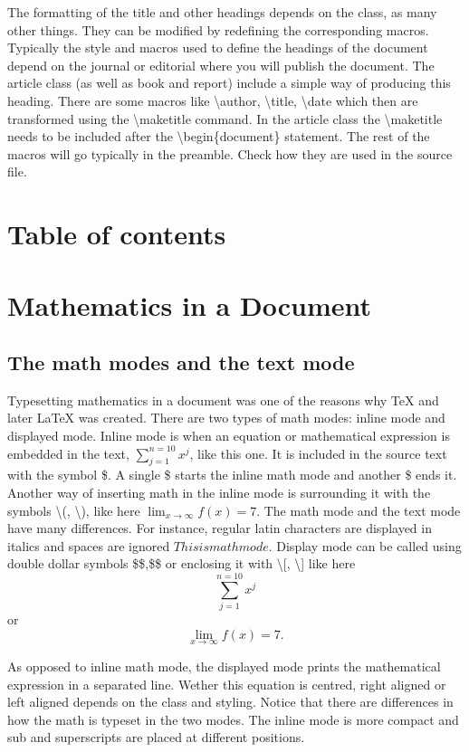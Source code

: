 \documentclass[a4paper]{article}
\newcommand{\bs}[1]{{\color{blue}\textbackslash{}#1}}
\begin{document}
The formatting of the title and other headings depends on the class, as many other things. They can be modified by redefining the corresponding macros. Typically the style and macros used to define the headings of the document depend on the journal or editorial where you will publish the document. The article class (as well as book and report) include a simple way of producing this heading. There are some macros like \bs{author}, \bs{title}, \bs{date} which then are transformed using the \bs{maketitle} command. In the article class the \bs{maketitle} needs to be included after the \bs{begin}\{document\} statement. The rest of the macros will go typically in the preamble. Check how they are used in the source file.


\section{Table of contents}


\section{Mathematics in a Document}

\subsection{The math modes and the text mode}

Typesetting mathematics in a document was one of the reasons why \TeX{} and later \LaTeX{} was created. There are two types of math modes: inline mode and displayed mode. Inline mode is when an equation or mathematical expression is embedded in the text, $\sum_{j=1}^{n=10}x^j$, like this one. It is included in the source text with the symbol \$. A single \$ starts the inline math mode and another \$ ends it. Another way of inserting math in the inline mode is surrounding it with the symbols \textbackslash(, \textbackslash), like here  \(\lim_{x\to\infty} f(x) = 7\). The math mode and the text mode have many differences. For instance, regular latin characters are displayed in italics and spaces are ignored $This is math mode$. Display mode can be called using double dollar symbols \$\$,\$\$ or enclosing it with \textbackslash[, \textbackslash] like here $$\sum_{j=1}^{n=10}x^j$$ or \[\lim_{x\to\infty} f(x) = 7.\]

As opposed to inline math mode, the displayed mode prints the mathematical expression in a separated line. Wether this equation is centred, right aligned or left aligned depends on the class and styling. Notice that there are differences in how the math is typeset in the two modes. The inline mode is more compact and sub and superscripts are placed at different positions.
\end{document}
